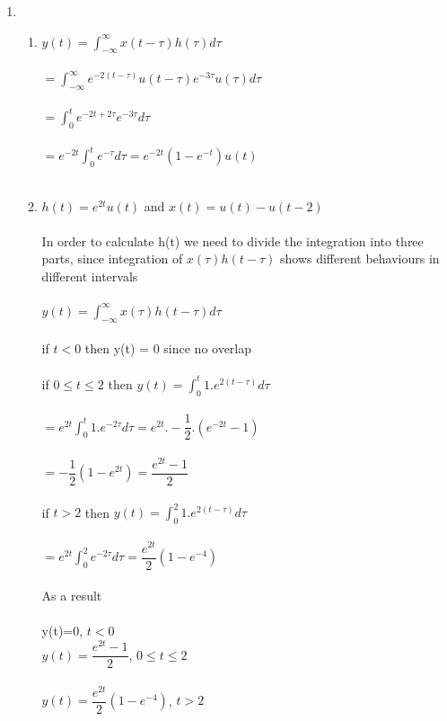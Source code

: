 \documentclass[10pt,a4paper, margin=1in]{article}
\begin{document}
\begin{enumerate}
\item %
    \begin{enumerate}
    \item %
    $y(t)=\int_{-\infty}^{\infty}x(t-\tau)h(\tau)d\tau$ \\ \\
    $= \int_{-\infty}^{\infty} e^{-2(t-\tau)}u(t-\tau)e^{-3\tau}u(\tau)d\tau$ \\ \\
    $ = \int_{0}^{t} e^{-2t+2\tau} e^{-3\tau} d\tau$ \\ \\
    $= e^{-2t} \int_{0}^{t}e^{-\tau} d\tau = e^{-2t}(1-e^{-t})u(t)$ \\ \\
    \item %
    $h(t) = e^{2t}u(t)$ and $x(t)=u(t)-u(t-2)$ \\ \\
    In order to calculate h(t) we need to divide the integration into three parts, since integration of $x(\tau)h(t-\tau)$ shows different behaviours in different intervals \\ \\
    $y(t) = \int_{-\infty}^{\infty}x(\tau)h(t-\tau)d\tau$ \\ \\
    if $t<0$ then y(t) = 0 since no overlap \\ \\
    if $ 0 \leq t \leq 2$ then $y(t)=\int_{0}^{t}1.e^{2(t-\tau)}d\tau$ \\ \\
    $=e^{2t}\int_{0}^{t}1.e^{-2\tau}d\tau = e^{2t}.-\dfrac{1}{2}.(e^{-2t}-1)$ \\ \\
    $= -\dfrac{1}{2}(1-e^{2t}) = \dfrac{e^{2t}-1}{2}$ \\ \\
    if $t>2$ then $ y(t) = \int_{0}^{2}1.e^{2(t-\tau)}d\tau$ \\ \\
    $ = e^{2t} \int_{0}^{2}e^{-2\tau}d\tau = \dfrac{e^{2t}}{2}(1-e^{-4}) $ \\ \\
    As a result \\ \\
    y(t)=0, $t<0$ \\
    $y(t)=\dfrac{e^{2t}-1}{2}$,  $0\leq t \leq 2$ \\ \\
    $y(t)=\dfrac{e^{2t}}{2}(1-e^{-4})$,  $t > 2$\\\\
    \end{enumerate}


\end{enumerate}
\end{document}
